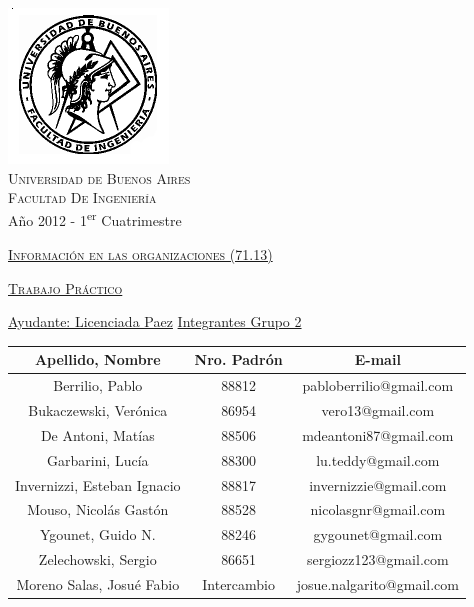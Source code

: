 \documentclass[12pt,titlepage]{report}
\begin{document}
\begin{titlepage}

\thispagestyle{empty}

\begin{center}
\includegraphics[scale=0.55]{./Images/fiuba}\\
\large{\textsc{Universidad de Buenos Aires}}\\
\large{\textsc{Facultad De Ingeniería}}\\
\small{Año 2012 - 1\textsuperscript{er} Cuatrimestre}
\end{center}

\vfill

\begin{center}

\Large{\underline{\textsc{Información en las organizaciones (71.13)}}}

\vfill


\Large{\underline{\textsc{Trabajo Práctico}}}
\vfill

\Large\underline{Ayudante: Licenciada Paez} \linebreak\linebreak
\Large\underline{Integrantes Grupo 2} \linebreak\linebreak

\large\addtolength{\tabcolsep}{-3pt}
\begin{tabular}{|| c | c | c ||}
\hline
\textbf{Apellido, Nombre} & \textbf{Nro. Padrón} & \textbf{E-mail} \\
\hline
Berrilio, Pablo & 88812 & pabloberrilio@gmail.com \\
\hline
Bukaczewski, Verónica & 86954 & vero13@gmail.com \\
\hline
De Antoni, Matías & 88506 & mdeantoni87@gmail.com \\
\hline
Garbarini, Lucía & 88300 & lu.teddy@gmail.com\\
\hline
Invernizzi, Esteban Ignacio & 88817 & invernizzie@gmail.com\\
\hline
Mouso, Nicolás Gastón & 88528 & nicolasgnr@gmail.com \\
\hline
Ygounet, Guido N. & 88246 & gygounet@gmail.com \\
\hline
Zelechowski, Sergio & 86651 & sergiozz123@gmail.com \\
\hline
Moreno Salas, Josué Fabio & Intercambio & josue.nalgarito@gmail.com \\
\hline
\end{tabular}
\end{center}


\end{titlepage}
\end{document}
